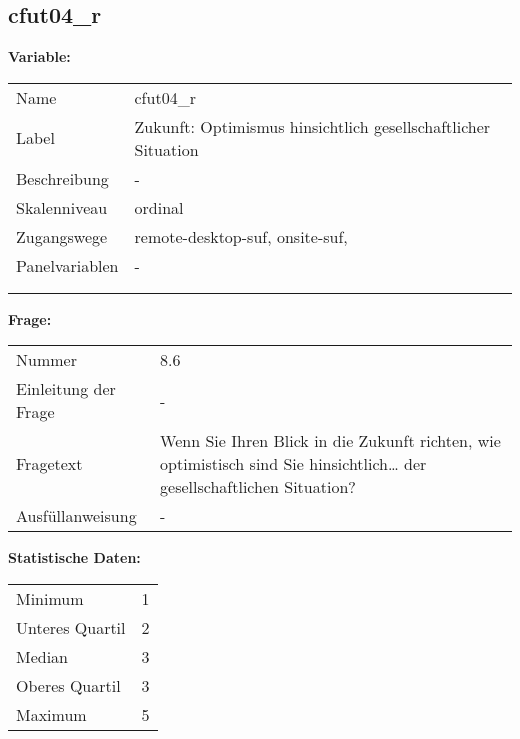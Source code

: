 	
	
	\subsection{cfut04\_r}
	\label{subSection:cfut04_r}

	\noindent\textbf{Variable:}\\
		\begin{tabular}{lL{11.3cm}}
			\label{tableVariable:cfut04_r}
			Name & cfut04\_r \\
			Label & Zukunft: Optimismus hinsichtlich gesellschaftlicher Situation \\
			Beschreibung & - \\
			Skalenniveau & ordinal \\
			Zugangswege &
				remote-desktop-suf,
				onsite-suf,
 \\
			Panelvariablen & -
			 \\
			 \\
 \\
		\end{tabular}

		\vspace*{1 cm}
		\noindent\textbf{Frage:}\\
		\begin{tabular}{lL{11.3cm}}
			\label{tableQuestion:cfut04_r}
			Nummer & 8.6 \\
			Einleitung der Frage & - \\
			Fragetext & Wenn Sie Ihren Blick in die Zukunft richten, wie optimistisch sind Sie hinsichtlich…
der gesellschaftlichen Situation? \\
			Ausfüllanweisung & - \\
		\end{tabular}


		\vspace*{1 cm}
		\noindent\textbf{Statistische Daten:}\\
			\begin{tabular}{ll}
				\label{tableStatistics:cfut04_r}
					Minimum & 1 \\
					Unteres Quartil & 2 \\
					Median & 3 \\
					Oberes Quartil & 3 \\
					Maximum & 5 \\
			\end{tabular}



